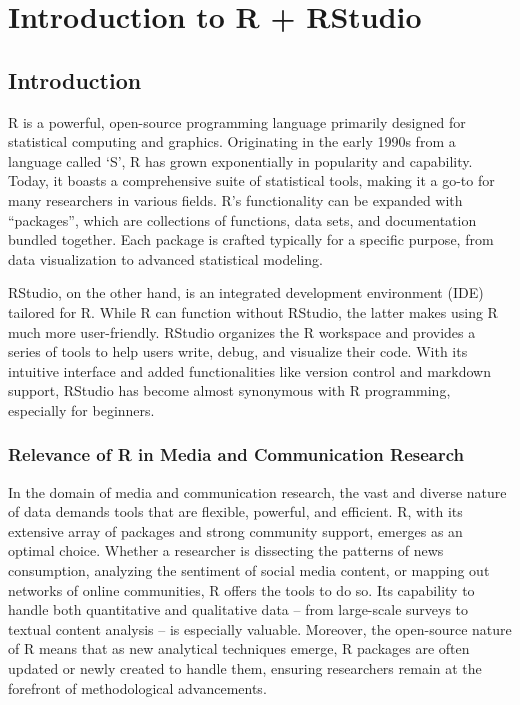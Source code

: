 \documentclass[
  b5paper]{book}
\begin{document}
\hypertarget{introduction-to-r-rstudio}{%
\chapter{Introduction to R + RStudio}\label{introduction-to-r-rstudio}}

\hypertarget{introduction-1}{%
\section{Introduction}\label{introduction-1}}

R is a powerful, open-source programming language primarily designed for statistical computing and graphics. Originating in the early 1990s from a language called `S', R has grown exponentially in popularity and capability. Today, it boasts a comprehensive suite of statistical tools, making it a go-to for many researchers in various fields. R's functionality can be expanded with ``packages'', which are collections of functions, data sets, and documentation bundled together. Each package is crafted typically for a specific purpose, from data visualization to advanced statistical modeling.

RStudio, on the other hand, is an integrated development environment (IDE) tailored for R. While R can function without RStudio, the latter makes using R much more user-friendly. RStudio organizes the R workspace and provides a series of tools to help users write, debug, and visualize their code. With its intuitive interface and added functionalities like version control and markdown support, RStudio has become almost synonymous with R programming, especially for beginners.

\hypertarget{relevance-of-r-in-media-and-communication-research}{%
\subsection*{Relevance of R in Media and Communication Research}\label{relevance-of-r-in-media-and-communication-research}}

In the domain of media and communication research, the vast and diverse nature of data demands tools that are flexible, powerful, and efficient. R, with its extensive array of packages and strong community support, emerges as an optimal choice. Whether a researcher is dissecting the patterns of news consumption, analyzing the sentiment of social media content, or mapping out networks of online communities, R offers the tools to do so. Its capability to handle both quantitative and qualitative data -- from large-scale surveys to textual content analysis -- is especially valuable. Moreover, the open-source nature of R means that as new analytical techniques emerge, R packages are often updated or newly created to handle them, ensuring researchers remain at the forefront of methodological advancements.
\end{document}
